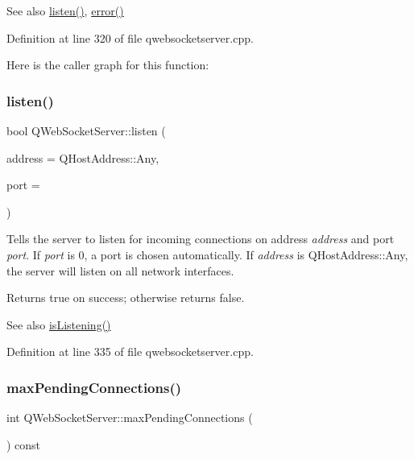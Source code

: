 \begin{DoxySeeAlso}{See also}
\mbox{\hyperlink{class_q_web_socket_server_a3859403d15dbb2b487a3990d68660841}{listen()}}, \mbox{\hyperlink{class_q_web_socket_server_ad7db68dd641e6a5ff0c40b8b4788e1fc}{error()}} 
\end{DoxySeeAlso}


Definition at line 320 of file qwebsocketserver.\+cpp.

Here is the caller graph for this function\+:
\mbox{\label{class_q_web_socket_server_a3859403d15dbb2b487a3990d68660841}} 
\subsubsection{\texorpdfstring{listen()}{listen()}}
{\footnotesize\ttfamily bool Q\+Web\+Socket\+Server\+::listen (\begin{DoxyParamCaption}\item[{const Q\+Host\+Address \&}]{address = {\ttfamily QHostAddress\+:\+:Any},  }\item[{quint16}]{port = {} }\end{DoxyParamCaption})}

Tells the server to listen for incoming connections on address {\itshape address} and port {\itshape port}. If {\itshape port} is 0, a port is chosen automatically. If {\itshape address} is Q\+Host\+Address\+::\+Any, the server will listen on all network interfaces.

Returns true on success; otherwise returns false.

\begin{DoxySeeAlso}{See also}
\mbox{\hyperlink{class_q_web_socket_server_a4505cb4c119bc490f8bf401998c6df43}{is\+Listening()}} 
\end{DoxySeeAlso}


Definition at line 335 of file qwebsocketserver.\+cpp.

\mbox{\label{class_q_web_socket_server_afd3bb35892c8eeaf92ceddc1654c2de7}} 
\subsubsection{\texorpdfstring{max\+Pending\+Connections()}{maxPendingConnections()}}
{\footnotesize\ttfamily int Q\+Web\+Socket\+Server\+::max\+Pending\+Connections (\begin{DoxyParamCaption}{ }\end{DoxyParamCaption}) const}

